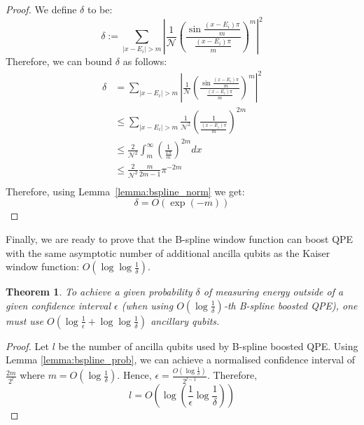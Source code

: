 \documentclass[aps,prx,twocolumn,floatfix,10pt,amssymb,amsfont,amsmath,superscriptaddress,float,nofootinbib,longbibliography,nobalancelastpage]{revtex4-2}
\theoremstyle{empty}
\newtheorem{duplicate}{Theorem}
\begin{document}
\begin{proof}
We define $\delta$ to be:
\begin{equation}
     \delta := \sum_{|x - E_i| > m} \left| \frac{1}{\mathcal{N}}\left(\frac{\sin \frac{(x-E_i)\pi}{m}}{ \frac{(x-E_i)\pi}{m}}\right)^m \right|^2
\end{equation}
Therefore, we can bound $\delta$ as follows:
    \begin{align}
        \delta &= \sum_{|x - E_i| > m} \left|\frac{1}{\mathcal{N}}\left(\frac{\sin \frac{(x-E_i)\pi}{m}}{ \frac{(x-E_i)\pi}{m}}\right)^m \right|^2 \\
        &\leq \sum_{|x - E_i| > m} \frac{1}{\mathcal{N}^2}\left(\frac{1}{ \frac{(x-E_i)\pi}{m}}\right)^{2m} \\
        &\leq \frac{2}{\mathcal{N}^2}\int_{m}^{\infty} \left(\frac{1}{ \frac{x\pi}{m}}\right)^{2m} dx\\
        & \leq  \frac{2}{\mathcal{N}^2} \frac{m}{2m-1}\pi^{-2m}\\
    \end{align}
    Therefore, using Lemma~\ref{lemma:bspline_norm} we get:
    \begin{equation}
        \delta = O(\exp(-m))
    \end{equation}
\end{proof}
Finally, we are ready to prove that the B-spline window function can boost QPE with the same asymptotic number of additional ancilla qubits as the Kaiser window function: $O\left(\log \log \frac{1}{\delta}\right)$.
\begin{duplicate}
To achieve a given probability $\delta$ of measuring energy outside of a given confidence interval $\epsilon$ (when using $O(\log \frac{1}{\delta})$-th B-spline boosted QPE), one must use $O(\log \frac{1}{\epsilon} + \log \log \frac{1}{\delta})$ ancillary qubits.
\end{duplicate}
\begin{proof}
Let $l$ be the number of ancilla qubits used by B-spline boosted QPE. Using Lemma \ref{lemma:bspline_prob}, we can achieve a normalised confidence interval of $\frac{2m}{2^l}$ where $m = O(\log \frac{1}{\delta})$. Hence, $\epsilon = \frac{O(\log \frac{1}{\delta})}{2^{l-1}}$. Therefore,
\begin{equation*}
    l = O\left(\log \left(\frac{1}{\epsilon}\log \frac{1}{\delta}\right)\right)
\end{equation*}
\end{proof}
\end{document}
